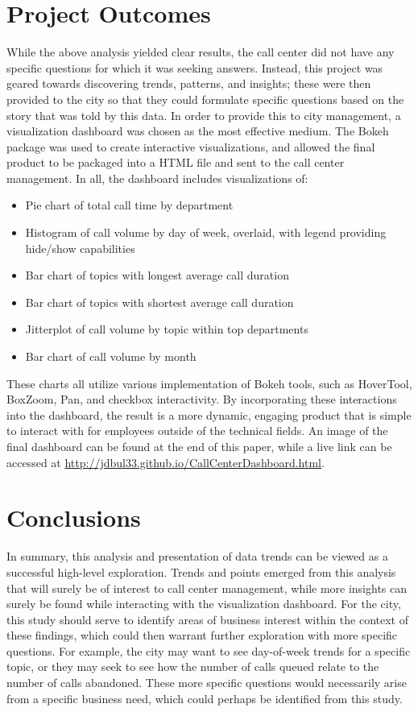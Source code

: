 \documentclass{article}
\begin{document}
\section{Project Outcomes}

While the above analysis yielded clear results, the call center did not have any specific questions for which it was seeking answers.  Instead, this project was geared towards discovering trends, patterns, and insights; these were then provided to the city so that they could formulate specific questions based on the story that was told by this data.  In order to provide this to city management, a visualization dashboard was chosen as the most effective medium.  The Bokeh package was used to create interactive visualizations, and allowed the final product to be packaged into a HTML file and sent to the call center management.  In all, the dashboard includes visualizations of:

\begin{itemize}
  \item{Pie chart of total call time by department}
  \item{Histogram of call volume by day of week, overlaid, with legend providing hide/show capabilities}
  \item{Bar chart of topics with longest average call duration}
  \item{Bar chart of topics with shortest average call duration}
  \item{Jitterplot of call volume by topic within top departments}
  \item{Bar chart of call volume by month}
\end{itemize}

These charts all utilize various implementation of Bokeh tools, such as HoverTool, BoxZoom, Pan, and checkbox interactivity.  By incorporating these interactions into the dashboard, the result is a more dynamic, engaging product that is simple to interact with for employees outside of the technical fields.  An image of the final dashboard can be found at the end of this paper, while a live link can be accessed at \href{http://jdbul33.github.io/CallCenterDashboard.html}{http://jdbul33.github.io/CallCenterDashboard.html}.


\section{Conclusions}

In summary, this analysis and presentation of data trends can be viewed as a successful high-level exploration.  Trends and points emerged from this analysis that will surely be of interest to call center management, while more insights can surely be found while interacting with the visualization dashboard.  For the city, this study should serve to identify areas of business interest within the context of these findings, which could then warrant further exploration with more specific questions.  For example, the city may want to see day-of-week trends for a specific topic, or they may seek to see how the number of calls queued relate to the number of calls abandoned.  These more specific questions would necessarily arise from a specific business need, which could perhaps be identified from this study.
\end{document}
